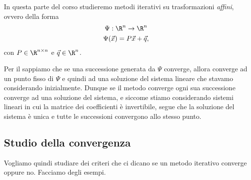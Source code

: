 In questa parte del corso studieremo metodi iterativi su trasformazioni \emph{affini}, ovvero della forma \begin{gather*}
    \Psi : \R^n \to \R^n\\
    \Psi(\vec x) = P\vec x + \vec q,
\end{gather*} con $P \in \Mat{\R, n, n}$ e $\vec q \in \R^n$. 

Per il  sappiamo che se una successione generata da $\Psi$ converge, allora converge ad un punto fisso di $\Psi$ e quindi ad una soluzione del sistema lineare che stavamo considerando inizialmente. 
Dunque se il metodo converge ogni sua successione converge ad una soluzione del sistema, e siccome stiamo considerando sistemi lineari in cui la matrice dei coefficienti è invertibile, segue che la soluzione del sistema è unica e tutte le successioni convergono allo stesso punto.

\subsection{Studio della convergenza}

Vogliamo quindi studiare dei criteri che ci dicano se un metodo iterativo converge oppure no. Facciamo degli esempi.

